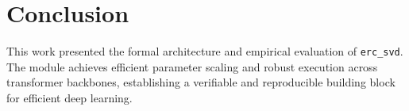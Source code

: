 \section{Conclusion}
This work presented the formal architecture and empirical evaluation of \texttt{erc_svd}. The module achieves efficient parameter scaling and robust execution across transformer backbones, establishing a verifiable and reproducible building block for efficient deep learning.
